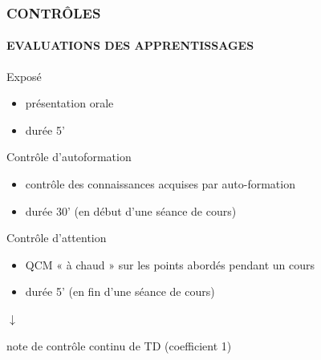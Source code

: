 \begin{frame}
\frametitle{\uppercase{Contrôles}}
\framesubtitle{\uppercase{Evaluations des apprentissages}}
\begin{block}{Exposé}
	\begin{itemize}
	\item présentation orale 
	\item durée 5' 
	\end{itemize}
\end{block}

\begin{block}{Contrôle d'autoformation}
	\begin{itemize}
	\item contrôle des connaissances acquises par auto-formation
	\item durée 30' (en début d'une séance de cours)
	\end{itemize}
\end{block}

\begin{block}{Contrôle d'attention}
	\begin{itemize}
	\item QCM « à chaud » sur les points abordés pendant un cours
	\item durée 5' (en fin d'une séance de cours)
	\end{itemize}
\end{block}

\centerline{$\downarrow$}
\centerline{\alert{note de contrôle continu de TD (coefficient 1)}}

\end{frame}
